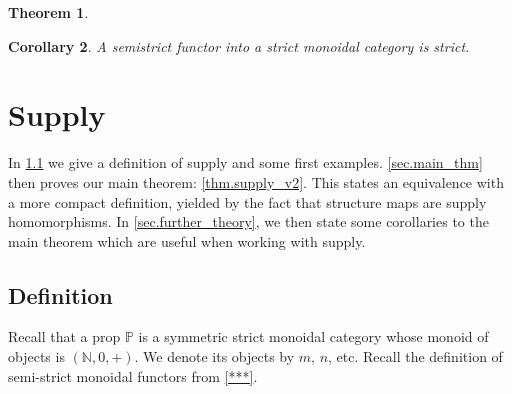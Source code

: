 \documentclass[11pt, oneside, article]{memoir}
\theoremstyle{plain}
\newtheorem{theorem}{Theorem}[chapter]
\newtheorem{corollary}[theorem]{Corollary}
\theoremstyle{definition}
\theoremstyle{remark}
\newcommand{\nn}{\mathbb{N}}
\newcommand{\pp}{\mathbb{P}}
\begin{document}
\begin{theorem} \label{thm.sstfae}
\end{theorem}

\begin{corollary} \label{cor.strict}
	A semistrict functor into a strict monoidal category is strict.
\end{corollary}


\chapter{Supply}

In \cref{sec.supply} we give a definition of supply and some first examples. \cref{sec.main_thm} then proves our main theorem: \cref{thm.supply_v2}. This states an equivalence with a more compact definition, yielded by the fact that structure maps are supply homomorphisms. In \cref{sec.further_theory}, we then state some corollaries to the main theorem which are useful when working with supply. 

\section{Definition}\label{sec.supply}

Recall that a prop $\pp$ is a symmetric strict monoidal category whose monoid of objects is $(\nn,0,+)$. We denote its objects by $m$, $n$, etc. Recall the definition of semi-strict monoidal functors from \cref{***}.
\end{document}
